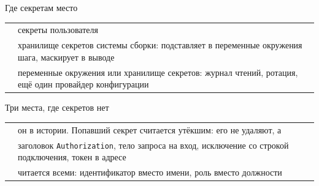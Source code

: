 \documentclass[aspectratio=169,10pt,t]{beamer}
\begin{document}
\begin{frame}{Где секретам место}
  \slidetop
  {\renewcommand{\arraystretch}{1.6}
  \begin{tabular}{@{}L{3.2cm}L{9.6cm}@{}}
     & секреты пользователя \\
       & хранилище секретов системы сборки: подставляет в
      переменные окружения шага, маскирует в выводе \\
         & переменные окружения или хранилище секретов: журнал
      чтений, ротация, ещё один провайдер конфигурации \\
  \end{tabular}}

  \slidegap
\end{frame}

\begin{frame}[plain]
\end{frame}

\begin{frame}{Три места, где секретов нет}
  \slidetop
  {\renewcommand{\arraystretch}{1.6}
  \begin{tabular}{@{}L{3.2cm}L{9.6cm}@{}}
     & он в истории. Попавший секрет считается утёкшим:
      его не удаляют, а  \\
            & заголовок \texttt{Authorization}, тело запроса на
      вход, исключение со строкой подключения, токен в адресе \\
           & читается всеми: идентификатор вместо имени, роль
      вместо должности \\
  \end{tabular}}

  \slidegap
\end{frame}

\begin{frame}[plain]
\end{frame}
\end{document}
